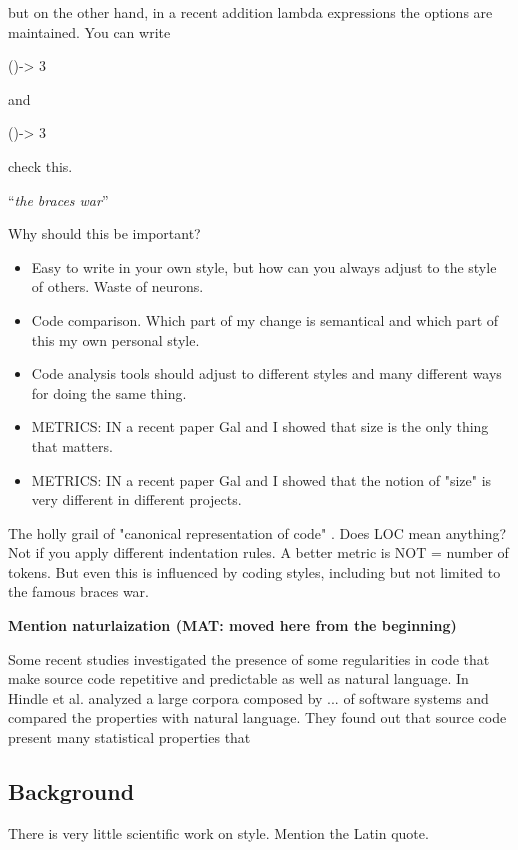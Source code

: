 but on the other hand, in a recent addition lambda expressions\cite{lambda}
the options are maintained.
You can write
\begin{JAVA}
()-> 3
\end{JAVA}
and
\begin{JAVA}
  ()-> {3}
\end{JAVA}
check this.

``\emph{the braces war}''


Why should this be important?
\begin{itemize}
    \item Easy to write in  your own style, but how can 
      you always adjust to the style of others.
      Waste of neurons.
    \item Code comparison. Which part of my change is semantical and which 
      part of this my own personal style.
    \item Code analysis tools should adjust to different styles and many
        different ways for doing the same thing.
    \item METRICS: IN a recent paper Gal and I showed that size 
      is the only thing that matters.
    \item METRICS: IN a recent paper Gal and I showed that the notion of 
      "size" is very different in different projects.
\end{itemize}

The holly grail of "canonical representation of code" .
Does LOC mean anything?
Not if you apply different indentation rules.
A better metric is NOT = number of tokens.
But even this is influenced by coding styles, including but 
not limited to the famous braces war.

\textbf{Mention naturlaization (MAT: moved here from the beginning)}

Some recent studies investigated the presence of some regularities in code that 
make source code repetitive and predictable as well as natural language.
In Hindle et al. \cite{Hindle:Bar:Su:Gabel:Devanbu:2012} analyzed a large corpora composed
by ... of software systems and compared the properties with natural language.
They found out that source code present many statistical properties that 

\subsection{Background}
There is very little scientific work on style.
Mention the Latin quote.

